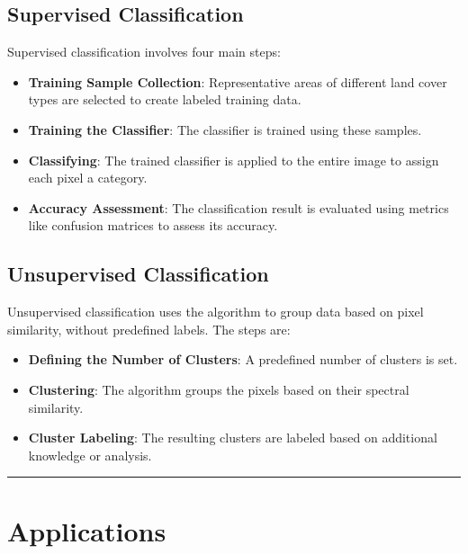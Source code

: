 \documentclass[
  letterpaper,
  DIV=11,
  numbers=noendperiod]{scrreprt}
\begin{document}
\subsection{Supervised Classification}\label{supervised-classification}

Supervised classification involves four main steps:

\begin{itemize}
\item
  \textbf{Training Sample Collection}: Representative areas of different
  land cover types are selected to create labeled training data.
\item
  \textbf{Training the Classifier}: The classifier is trained using
  these samples.
\item
  \textbf{Classifying}: The trained classifier is applied to the entire
  image to assign each pixel a category.
\item
  \textbf{Accuracy Assessment}: The classification result is evaluated
  using metrics like confusion matrices to assess its accuracy.
\end{itemize}

\subsection{Unsupervised
Classification}\label{unsupervised-classification}

Unsupervised classification uses the algorithm to group data based on
pixel similarity, without predefined labels. The steps are:

\begin{itemize}
\item
  \textbf{Defining the Number of Clusters}: A predefined number of
  clusters is set.
\item
  \textbf{Clustering}: The algorithm groups the pixels based on their
  spectral similarity.
\item
  \textbf{Cluster Labeling}: The resulting clusters are labeled based on
  additional knowledge or analysis.
\end{itemize}

\begin{center}\rule{0.5\linewidth}{0.5pt}\end{center}

\section{Applications}\label{applications-3}
\end{document}
